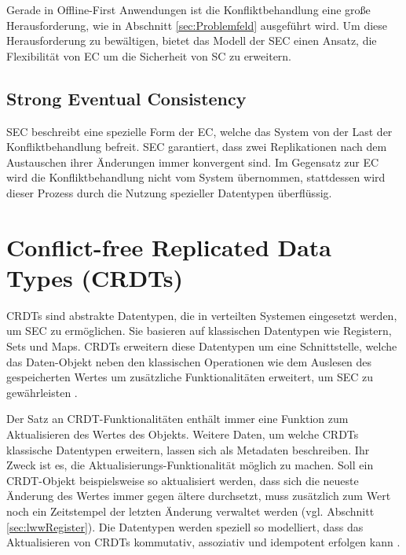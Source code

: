 \documentclass[a4paper, 12pt]{scrreprt}
\begin{document}
Gerade in Offline-First Anwendungen ist die Konfliktbehandlung eine große Herausforderung, wie in Abschnitt \ref{sec:Problemfeld} ausgeführt wird. Um diese Herausforderung zu bewältigen, bietet das Modell der \acf{SEC} einen Ansatz, die Flexibilität von \ac{EC} um die Sicherheit von \ac{SC} zu erweitern. 




\subsection{Strong Eventual Consistency}


\ac{SEC} beschreibt eine spezielle Form der \acf{EC}, welche das System von der Last der Konfliktbehandlung befreit. \ac{SEC} garantiert, dass zwei Replikationen nach dem Austauschen ihrer Änderungen immer konvergent sind. Im Gegensatz zur \ac{EC} wird die Konfliktbehandlung nicht vom System übernommen, stattdessen wird dieser Prozess durch die Nutzung spezieller Datentypen überflüssig. 


\section{Conflict-free Replicated Data Types (CRDTs)}
\label{sec:CRDTs}

\acp{CRDT} sind abstrakte Datentypen, die in verteilten Systemen eingesetzt werden, um \ac{SEC} zu ermöglichen. Sie basieren auf klassischen Datentypen wie Registern, Sets und Maps. \acp{CRDT} erweitern diese Datentypen um eine Schnittstelle, welche das Daten-Objekt neben den klassischen Operationen wie dem Auslesen des gespeicherten Wertes um zusätzliche Funktionalitäten erweitert, um \ac{SEC} zu gewährleisten \autocite[S.~1]{ArticleCRDTOverview}. 

Der Satz an CRDT-Funktionalitäten enthält immer eine Funktion zum Aktualisieren des Wertes des Objekts. Weitere Daten, um welche \acp{CRDT} klassische Datentypen erweitern, lassen sich als Metadaten beschreiben. Ihr Zweck ist es, die Aktualisierungs-Funktionalität möglich zu machen. Soll ein CRDT-Objekt beispielsweise so aktualisiert werden, dass sich die neueste Änderung des Wertes immer gegen ältere durchsetzt, muss zusätzlich zum Wert noch ein Zeitstempel der letzten Änderung verwaltet werden (vgl. Abschnitt \ref{sec:lwwRegister}).
Die Datentypen werden speziell so modelliert, dass das Aktualisieren von \acp{CRDT} kommutativ, assoziativ und idempotent erfolgen kann \autocite{InproceedingsCrdtsInProduction}.
\end{document}

